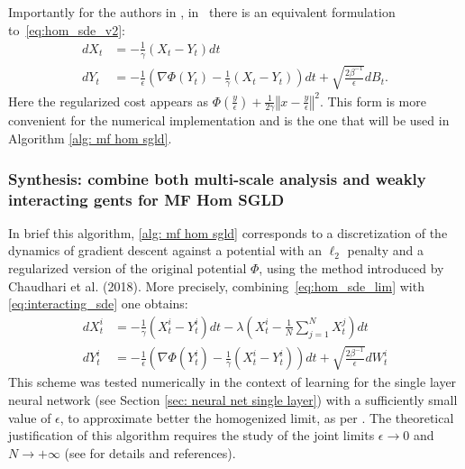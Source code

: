 \documentclass{article}
\theoremstyle{mystyle}
\begin{document}
Importantly for the authors in \cite{kantas2019sharpflatshallowweakly}, in~\cite{Chaudhari2017DeepRP} there is an equivalent formulation
to~\ref{eq:hom_sde_v2}: \begin{subequations}\label{eq:hom_sde}
\begin{align}
dX_{t} & =-\frac{1}{\gamma}(X_{t}-Y_{t})dt\label{eq:hom_sde1}\\
dY_{t} & =-\frac{1}{\epsilon}\left(\nabla\Phi(Y_{t})-\frac{1}{\gamma}(X_{t}-Y_{t})\right)dt+\sqrt{\frac{2\beta^{-1}}{\epsilon}}dB_{t}.\label{eq:hom_sde2}
\end{align}
\end{subequations} Here the regularized cost appears as $\Phi(\frac{y}{\epsilon})+\frac{1}{2\gamma}\left\Vert x-\frac{y}{\epsilon}\right\Vert ^{2}$.
This form is more convenient for the numerical implementation and
is the one that will be used in Algorithm \ref{alg: mf hom sgld}.


\subsubsection{Synthesis: combine both multi-scale analysis and weakly interacting gents for MF Hom SGLD}
In brief this algorithm, \ref{alg: mf hom sgld} corresponds to a discretization of the dynamics of gradient descent against a potential with an $ \ell_{2}$ penalty and a regularized version of the original potential $\Phi$, using the method introduced by Chaudhari et al. (2018). More precisely, combining~\ref{eq:hom_sde_lim} with \ref{eq:interacting_sde}
one obtains: 
\begin{align}
dX_{t}^{i} & =-\frac{1}{\gamma}(X_{t}^{i}-Y_{t}^{i})dt-\lambda\left(X_{t}^{i}-\frac{1}{N}\sum_{j=1}^{N}X_{t}^{j}\right)dt\label{eq:hom_mf_sde1}\\
dY_{t}^{i} & =-\frac{1}{\epsilon}\left(\nabla\Phi(Y_{t}^{i})-\frac{1}{\gamma}(X_{t}^{i}-Y_{t}^{i})\right)dt+\sqrt{\frac{2\beta^{-1}}{\epsilon}}dW_{t}^{i}\label{eq:hom_mf_sde2}
\end{align}
This scheme was tested numerically in the context of learning for the single layer neural network (see Section \ref{sec: neural net single layer}) with a sufficiently small value of $\epsilon$,
to approximate better the homogenized limit, as per \cite{kantas2019sharpflatshallowweakly}. The theoretical justification of this algorithm requires the study of the joint limits $\epsilon\rightarrow0$
and $N\rightarrow+\infty$ (see \cite[p. 6]{kantas2019sharpflatshallowweakly} for details and references). \\ 
\end{document}
